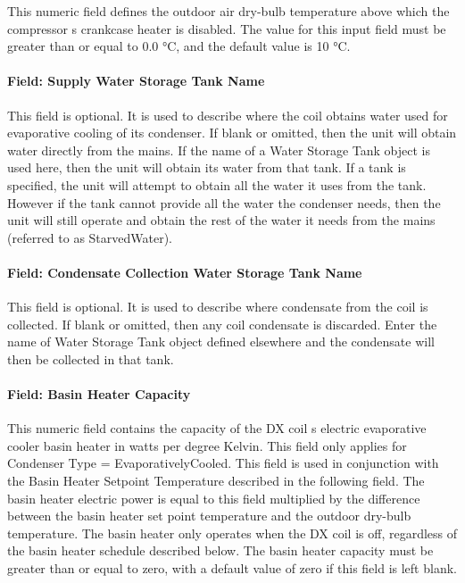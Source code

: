 This numeric field defines the outdoor air dry-bulb temperature above which the compressor s crankcase heater is disabled. The value for this input field must be greater than or equal to 0.0 °C, and the default value is 10 °C.

\paragraph{Field: Supply Water Storage Tank Name}\label{field-supply-water-storage-tank-name-000}

This field is optional. It is used to describe where the coil obtains water used for evaporative cooling of its condenser. If blank or omitted, then the unit will obtain water directly from the mains. If the name of a Water Storage Tank object is used here, then the unit will obtain its water from that tank. If a tank is specified, the unit will attempt to obtain all the water it uses from the tank. However if the tank cannot provide all the water the condenser needs, then the unit will still operate and obtain the rest of the water it needs from the mains (referred to as StarvedWater).

\paragraph{Field: Condensate Collection Water Storage Tank Name}\label{field-condensate-collection-water-storage-tank-name-2}

This field is optional. It is used to describe where condensate from the coil is collected. If blank or omitted, then any coil condensate is discarded. Enter the name of Water Storage Tank object defined elsewhere and the condensate will then be collected in that tank.

\paragraph{Field: Basin Heater Capacity}\label{field-basin-heater-capacity-000}

This numeric field contains the capacity of the DX coil s electric evaporative cooler basin heater in watts per degree Kelvin. This field only applies for Condenser Type = EvaporativelyCooled. This field is used in conjunction with the Basin Heater Setpoint Temperature described in the following field. The basin heater electric power is equal to this field multiplied by the difference between the basin heater set point temperature and the outdoor dry-bulb temperature. The basin heater only operates when the DX coil is off, regardless of the basin heater schedule described below. The basin heater capacity must be greater than or equal to zero, with a default value of zero if this field is left blank.

